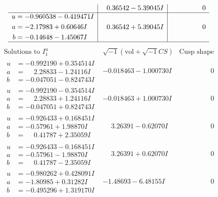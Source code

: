 \documentclass[1p]{elsarticle_modified}
\theoremstyle{definition}
\newcommand{\I}{\sqrt{-1}}
\begin{document}
$$\begin{array}{c|c|c}
 & \phantom{-}0.36542 - 5.39045 I & \phantom{-0.000000 } 0 \\ \hline\begin{aligned}
u &= -0.960538 - 0.419471 I \\
a &= -2.17983 + 0.60646 I \\
b &= -0.14648 - 1.45067 I\end{aligned}
 & \phantom{-}0.36542 + 5.39045 I & \phantom{-0.000000 } 0\\
 \hline 
 \end{array}$$\newpage$$\begin{array}{c|c|c}  
\text{Solutions to }I^u_{1}& \I (\text{vol} + \sqrt{-1}CS) & \text{Cusp shape}\\
 \hline 
\begin{aligned}
u &= -0.992190 + 0.354514 I \\
a &= \phantom{-}2.28833 - 1.24116 I \\
b &= -0.047051 - 0.824743 I\end{aligned}
 & -0.018463 - 1.000730 I & \phantom{-0.000000 } 0 \\ \hline\begin{aligned}
u &= -0.992190 - 0.354514 I \\
a &= \phantom{-}2.28833 + 1.24116 I \\
b &= -0.047051 + 0.824743 I\end{aligned}
 & -0.018463 + 1.000730 I & \phantom{-0.000000 } 0 \\ \hline\begin{aligned}
u &= -0.926433 + 0.168451 I \\
a &= -0.57961 + 1.98870 I \\
b &= \phantom{-}0.41787 + 2.35059 I\end{aligned}
 & \phantom{-}3.26391 - 0.62070 I & \phantom{-0.000000 } 0 \\ \hline\begin{aligned}
u &= -0.926433 - 0.168451 I \\
a &= -0.57961 - 1.98870 I \\
b &= \phantom{-}0.41787 - 2.35059 I\end{aligned}
 & \phantom{-}3.26391 + 0.62070 I & \phantom{-0.000000 } 0 \\ \hline\begin{aligned}
u &= -0.980262 + 0.428091 I \\
a &= -1.80985 + 0.31282 I \\
b &= -0.495296 + 1.319170 I\end{aligned}
 & -1.48693 - 6.48155 I & \phantom{-0.000000 } 0 \\ \hline\begin{aligned}

\end{aligned}
\end{array}$$
\end{document}

